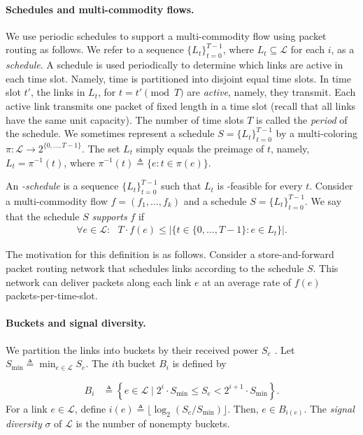 \documentclass[11pt]{article}
\newenvironment{proof sketch}{\noindent {\bf Proof sketch:} }{\hfill \qed}
\newcommand{\sinr}{\text{\sc{sinr}}}
\newcommand{\LL}{\mathcal{L}}
\newcommand{\eqdf}{\triangleq}
\newcommand{\sigdiv}{\sigma}
\begin{document}
\paragraph{Schedules and multi-commodity flows.}
We use periodic schedules to support a multi-commodity flow using
packet routing as follows.  We refer to a sequence
$\{L_t\}_{t=0}^{T-1}$, where $L_t\subseteq\LL$ for each $i$, as a
\emph{schedule}. A schedule is used periodically to determine which
links are active in each time slot.  Namely, time is partitioned into
disjoint equal time slots.  In time slot $t'$, the links in $L_t$, for
$t=t' \pmod T$ are \emph{active}, namely, they transmit.  Each active
link transmits one packet of fixed length in a time slot (recall that
all links have the same unit capacity).  The number of time slots $T$
is called the \emph{period} of the schedule. We sometimes represent a
schedule $S=\{L_t\}_{t=0}^{T-1}$ by a multi-coloring $\pi:\LL
\rightarrow 2^{\{0,\ldots,T-1\}}$.  The set $L_t$ simply equals the
preimage of $t$, namely, $L_t=\pi^{-1}(t)$, where
$\pi^{-1}(t)\eqdf\{e: t\in \pi(e)\}$.

An \emph{\sinr-schedule} is a sequence
$\{L_t\}_{t=0}^{T-1}$ such that $L_t$ is \sinr-feasible for every $t$.
Consider a multi-commodity flow $f=(f_1,\ldots,f_k)$ and a
schedule $S=\{L_t\}_{t=0}^{T-1}$. We say that the schedule $S$
\emph{supports} $f$ if
\begin{align*}
\forall e\in \LL:~~~  T \cdot f(e) \leq \left|\{t\in \{0,\ldots,T-1\} : e\in L_t\}\right|.
\end{align*}


The motivation for this definition is as follows. Consider a store-and-forward packet
routing network that schedules links according to the schedule $S$.
This network can
deliver packets along each link $e$ at an average rate of $f(e)$
packets-per-time-slot.

\paragraph{Buckets and signal diversity.}
We partition the links into buckets by their received power $S_e$ . Let $S_{\min} \eqdf \min_{e\in \LL} S_e$.
The $i$th bucket $B_i$ is defined by

\begin{align*}
  B_i &\eqdf \left\{e\in \LL \mid 2^i \cdot S_{\min} \leq S_e <2^{i+1}\cdot S_{\min}   \right\}.
\end{align*}
For a link $e\in \LL$, define $i(e)\eqdf\lfloor\log_2 (S_e/S_{\min})
\rfloor$.  Then, $e\in B_{i(e)}$.  The \emph{signal diversity} $\sigdiv$ of $\LL$
is the number of nonempty buckets.
\end{document}
